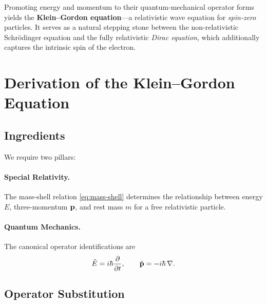 \documentclass[12pt, a4paper]{article}
\theoremstyle{definition}
\begin{document}
Promoting energy and momentum to their quantum-mechanical operator forms yields
the \textbf{Klein--Gordon equation}---a relativistic wave equation for
\emph{spin-zero} particles.  It serves as a natural stepping stone between the
non-relativistic Schr\"{o}dinger equation and the fully relativistic
\emph{Dirac equation}, which additionally captures the intrinsic spin of the
electron.

\section{Derivation of the Klein--Gordon Equation}
\label{sec:derivation}

\subsection{Ingredients}

We require two pillars:

\paragraph{Special Relativity.}
The mass-shell relation \eqref{eq:mass-shell} determines the relationship
between energy $E$, three-momentum $\vb{p}$, and rest mass $m$ for a free
relativistic particle.

\paragraph{Quantum Mechanics.}
The canonical operator identifications are
\begin{equation}\label{eq:operators}
    \hat{E} = i\hbar\frac{\partial}{\partial t},
    \qquad
    \hat{\vb{p}} = -i\hbar\,\nabla.
\end{equation}

\subsection{Operator Substitution}
\end{document}
